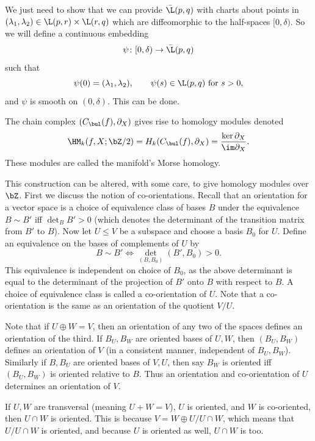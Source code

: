 We just need to show that we can provide $\bar\L(p,q)$ with charts about points in
$(\lambda_1,\lambda_2)\in\L(p,r)\times\L(r,q)$ which are diffeomorphic to the half-spaces $[0,\delta)$.
So we will define a continuous embedding
$$ \psi\colon[0,\delta) \to \bar\L(p,q) $$
such that
$$ \psi(0) = (\lambda_1,\lambda_2),\qquad \psi(s) \in \L(p,q)\hbox{ for $s>0$}, $$
and $\psi$ is smooth on $(0,\delta)$.
This can be done.\CITE

\bdefn

    The chain complex $(C_\bul(f),\partial_X)$ gives rise to homology modules denoted
    $$ \HM_k(f,X;\bZ/2) = H_k(C_\bul(f),\partial_X) = \frac{\ker\partial_X}{\im\partial_X} . $$
    These modules are called the manifold's {\emphcolor Morse homology}.

\edefn

\bremark

    This construction can be altered, with some care, to give homology modules over $\bZ$.
    First we discuss the notion of co-orientations.
    Recall that an orientation for a vector space is a choice of equivalence class of bases $B$ under the equivalence
    $B\sim B'$ iff $\det_BB'>0$ (which denotes the determinant of the transition matrix from $B'$ to $B$).
    Now let $U\leq V$ be a subspace and choose a basis $B_0$ for $U$.
    Define an equivalence on the bases of complements of $U$ by
    $$ B \sim B' \iff \det_{(B,B_0)}(B',B_0) > 0 . $$
    This equivalence is independent on choice of $B_0$, as the above determinant is equal to the determinant of the projection of $B'$
    onto $B$ with respect to $B$.
    A choice of equivalence class is called a {\emphcolor co-orientation of $U$}.
    Note that a co-orientation is the same as an orientation of the quotient $V/U$.

    Note that if $U\oplus W=V$, then an orientation of any two of the spaces defines an orientation of
    the third.
    If $B_U,B_W$ are oriented bases of $U,W$, then $(B_U,B_W)$ defines an orientation of $V$ (in a consistent
    manner, independent of $B_U,B_W$).
    Similarly if $B,B_U$ are oriented bases of $V,U$, then say $B_W$ is oriented iff $(B_U,B_W)$ is oriented
    relative to $B$.
    Thus an orientation and co-orientation of $U$ determines an orientation of $V$.

    If $U,W$ are transversal (meaning $U+W=V$), $U$ is oriented, and $W$ is co-oriented, then $U\cap W$
    is oriented.
    This is because $V=W\oplus U/U\cap W$, which means that $U/U\cap W$ is oriented, and because $U$ is
    oriented as well, $U\cap W$ is too.

